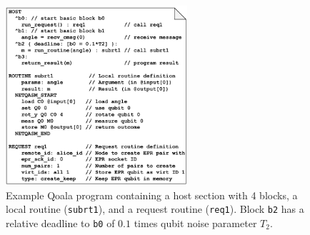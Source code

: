 \begin{figure}
    \centering
    \includegraphics[width=0.6\textwidth]{figures/qoala/example_program.pdf}
    \caption{
        Example Qoala program containing a host section with 4 blocks, a local routine (\texttt{subrt1}),
        and a request routine (\texttt{req1}). Block \texttt{b2} has a relative deadline to \texttt{b0} of $0.1$ times qubit noise parameter $T_2$.
    }
    \label{qoala:fig:example_program}
\end{figure}

